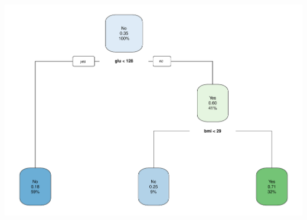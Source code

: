 \documentclass[landscape,a2paper,fontscale=0.833]{baposter}
\begin{document}
\begin{poster}
{\begin{center}
    \includegraphics[width=0.7\linewidth]{presentation/pimaprune.pdf}
    \label{fig:pima2}
\end{center}


}


\end{poster}
\end{document}
